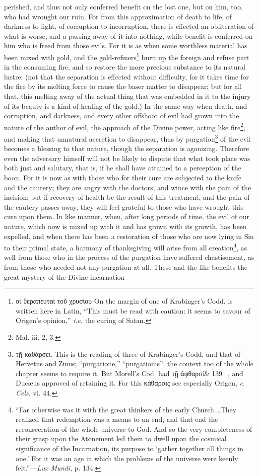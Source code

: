 perished, and thus not only conferred benefit on the lost one, but on him, too, who had wrought our ruin. For from this approximation of death to life, of darkness to light, of corruption to incorruption, there is effected an obliteration of what is worse, and a passing away of it into nothing, while benefit is conferred on him who is freed from those evils. For it is as when some worthless material has been mixed with gold, and the gold-refiners\footnote{\textgreek{οἱ θεραπευταὶ τοῦ χρυσίου} On the margin of one of Krabinger’s Codd. is written here in Latin, “This must be read with caution: it seems to savour of Origen’s opinion,” \emph{i.e.} the curing of Satan.} burn up the foreign and refuse part in the consuming fire, and so restore the more precious substance to its natural lustre: (not that the separation is effected without difficulty, for it takes time for the fire by its melting force to cause the baser matter to disappear; but for all that, this melting away of the actual thing that was embedded in it to the injury of its beauty is a kind of healing of the gold.) In the same way when death, and corruption, and darkness, and every other offshoot of evil had grown into the nature of the author of evil, the approach of the Divine power, acting like fire\footnote{Mal. iii. 2, 3.}, and making that unnatural accretion to disappear, thus by purgation\footnote{\textgreek{τῇ καθάρσει}. This is the reading of three of Krabinger’s Codd. and that of Hervetus and Zinus; “purgatione,” “purgationis”: the context too of the whole chapter seems to require it. But Morell’s Cod. had \textgreek{τῇ ἀφθαρσί\& 139·}, and Ducæus approved of retaining it. For this \textgreek{κάθαρσις} see especially Origen, \emph{c. Cels.} vi. 44.} of the evil becomes a blessing to that nature, though the separation is agonizing. Therefore even the adversary himself will not be likely to dispute that what took place was both just and salutary, that is, if he shall have attained to a perception of the boon. For it is now as with those who for their cure are subjected to the knife and the cautery; they are angry with the doctors, and wince with the pain of the incision; but if recovery of health be the result of this treatment, and the pain of the cautery passes away, they will feel grateful to those who have wrought this cure upon them. In like manner, when, after long periods of time, the evil of our nature, which now is mixed up with it and has grown with its growth, has been expelled, and when there has been a restoration of those who are now lying in Sin to their primal state, a harmony of thanksgiving will arise from all creation\footnote{“Far otherwise was it with the great thinkers of the early Church.…They realized that redemption was a means to an end, and that end the reconsecration of the whole universe to God. And so the very completeness of their grasp upon the Atonement led them to dwell upon the cosmical significance of the Incarnation, its purpose to ‘gather together all things in one.’ For it was an age in which the problems of the universe were keenly felt.”—\emph{Lux Mundi,} p. 134.}, as well from those who in the process of the purgation have suffered chastisement, as from those who needed not any purgation at all. These and the like benefits the great mystery of the Divine incarnation 
